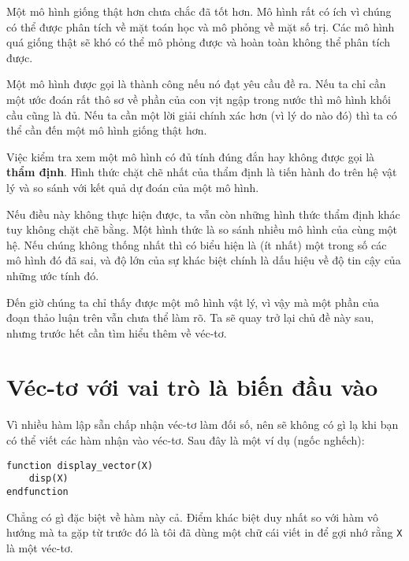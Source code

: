 \documentclass[12pt]{book}
\begin{document}
Một mô hình giống thật hơn chưa chắc đã tốt hơn. Mô hình rất có ích
vì chúng có thể được phân tích về mặt toán học và mô phỏng về
mặt số trị. Các mô hình quá giống thật sẽ khó có thể mô phỏng được
và hoàn toàn không thể phân tích được.

Một mô hình được gọi là thành công nếu nó đạt yêu cầu đề ra. Nếu ta
chỉ cần một ước đoán rất thô sơ về phần của con vịt ngập trong nước
thì mô hình khối cầu cũng là đủ. Nếu ta cần một lời giải chính xác hơn
(vì lý do nào đó) thì ta có thể cần đến một mô hình giống thật hơn.



Việc kiểm tra xem một mô hình có đủ tính đúng đắn hay không được
gọi là {\bf thẩm định}. Hình thức chặt chẽ nhất của thẩm định là 
tiến hành đo trên hệ vật lý và so sánh với kết quả dự đoán của một
mô hình.

Nếu điều này không thực hiện được, ta vẫn còn những hình thức 
thẩm định khác tuy không chặt chẽ bằng. Một hình thức là so sánh
nhiều mô hình của cùng một hệ. Nếu chúng không thống nhất thì
có biểu hiện là (ít nhất) một trong số các mô hình đó đã sai, và
độ lớn của sự khác biệt chính là dấu hiệu về độ tin cậy của những
ước tính đó.

Đến giờ chúng ta chỉ thấy được một mô hình vật lý, vì vậy mà 
một phần của đoạn thảo luận trên vẫn chưa thể làm rõ. Ta sẽ 
quay trở lại chủ đề này sau, nhưng trước hết cần tìm hiểu thêm
về véc-tơ.



\section{Véc-tơ với vai trò là biến đầu vào}

Vì nhiều hàm lập sẵn chấp nhận véc-tơ làm đối số, nên sẽ không
có gì lạ khi bạn có thể viết các hàm nhận vào véc-tơ. Sau đây là
một ví dụ (ngốc nghếch):

\begin{verbatim}
function display_vector(X)
    disp(X)
endfunction
\end{verbatim}
%
Chẳng có gì đặc biệt về hàm này cả. Điểm khác biệt duy nhất
so với hàm vô hướng mà ta gặp từ trước đó là tôi đã dùng một
chữ cái viết in để gợi nhớ rằng {\tt X} là một véc-tơ.
\end{document}

